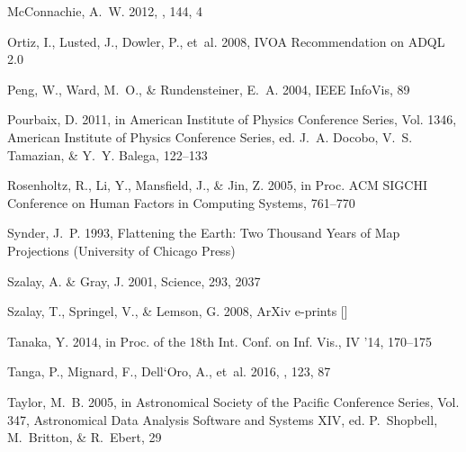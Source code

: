 \documentclass[longauth, final]{aa}
\begin{document}
\begin{thebibliography}{46}
{McConnachie}, A.~W. 2012, \aj, 144, 4

{Ortiz}, I., {Lusted}, J., {Dowler}, P., {et~al.} 2008, IVOA Recommendation on
  ADQL 2.0

Peng, W., Ward, M.~O., \& Rundensteiner, E.~A. 2004, IEEE InfoVis, 89

{Pourbaix}, D. 2011, in American Institute of Physics Conference Series, Vol.
  1346, American Institute of Physics Conference Series, ed. J.~A. {Docobo},
  V.~S. {Tamazian}, \& Y.~Y. {Balega}, 122--133

Rosenholtz, R., Li, Y., Mansfield, J., \& Jin, Z. 2005, in Proc. ACM SIGCHI
  Conference on Human Factors in Computing Systems, 761--770

Synder, J.~P. 1993, Flattening the Earth: Two Thousand Years of Map Projections
  (University of Chicago Press)

{Szalay}, A. \& {Gray}, J. 2001, Science, 293, 2037

{Szalay}, T., {Springel}, V., \& {Lemson}, G. 2008, ArXiv e-prints
  []

Tanaka, Y. 2014, in Proc. of the 18th Int. Conf. on Inf. Vis., IV ’14,
  170--175

{Tanga}, P., {Mignard}, F., {Dell`Oro}, A., {et~al.} 2016, \planss, 123, 87

{Taylor}, M.~B. 2005, in Astronomical Society of the Pacific Conference Series,
  Vol. 347, Astronomical Data Analysis Software and Systems XIV, ed.
  P.~{Shopbell}, M.~{Britton}, \& R.~{Ebert}, 29


\end{thebibliography}
\end{document}
